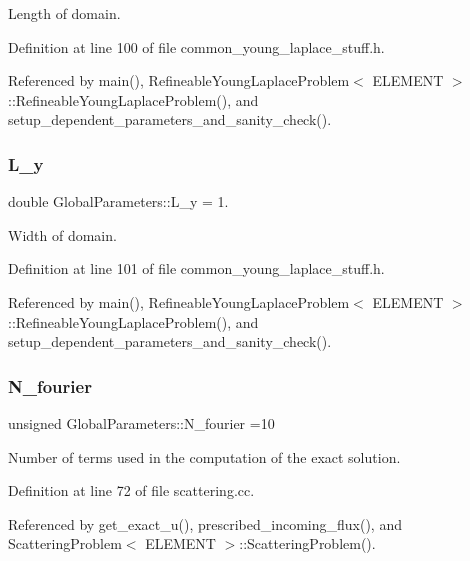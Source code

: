 Length of domain. 

Definition at line 100 of file common\+\_\+young\+\_\+laplace\+\_\+stuff.\+h.



Referenced by main(), Refineable\+Young\+Laplace\+Problem$<$ E\+L\+E\+M\+E\+N\+T $>$\+::\+Refineable\+Young\+Laplace\+Problem(), and setup\+\_\+dependent\+\_\+parameters\+\_\+and\+\_\+sanity\+\_\+check().

\mbox{\label{namespaceGlobalParameters_ac8774b3418c4551091d64ec72c169b2e}} 
\subsubsection{\texorpdfstring{L\+\_\+y}{L\_y}}
{\footnotesize\ttfamily double Global\+Parameters\+::\+L\+\_\+y = 1.}



Width of domain. 



Definition at line 101 of file common\+\_\+young\+\_\+laplace\+\_\+stuff.\+h.



Referenced by main(), Refineable\+Young\+Laplace\+Problem$<$ E\+L\+E\+M\+E\+N\+T $>$\+::\+Refineable\+Young\+Laplace\+Problem(), and setup\+\_\+dependent\+\_\+parameters\+\_\+and\+\_\+sanity\+\_\+check().

\mbox{\label{namespaceGlobalParameters_ae4df03bf0ffa55b741ac846ca7b6c155}} 
\subsubsection{\texorpdfstring{N\+\_\+fourier}{N\_fourier}}
{\footnotesize\ttfamily unsigned Global\+Parameters\+::\+N\+\_\+fourier =10}



Number of terms used in the computation of the exact solution. 



Definition at line 72 of file scattering.\+cc.



Referenced by get\+\_\+exact\+\_\+u(), prescribed\+\_\+incoming\+\_\+flux(), and Scattering\+Problem$<$ E\+L\+E\+M\+E\+N\+T $>$\+::\+Scattering\+Problem().

